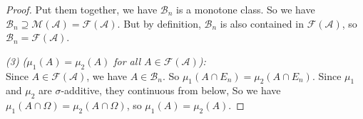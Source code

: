 \begin{proof}
  Put them together, we have $\mathcal{B}_n$ is a monotone class.
  So we have $\mathcal{B}_n \supseteq \mathcal{M}(\mathcal{A}) = \mathcal{F}(\mathcal{A})$.
  But by definition, $\mathcal{B}_n$ is also contained in $\mathcal{F}(\mathcal{A})$, so
  $\mathcal{B}_n = \mathcal{F}(\mathcal{A})$.

  \emph{(3) ($\mu_1(A) = \mu_2(A)$ for all $A\in\mathcal{F}(\mathcal{A})$):}\\
  Since $A\in\mathcal{F}(\mathcal{A})$, we have $A\in\mathcal{B}_n$.
  So $\mu_1(A\cap E_n) = \mu_2(A\cap E_n)$.
  Since $\mu_1$ and $\mu_2$ are $\sigma$-additive, they continuous from below,
  So we have $\mu_1(A\cap \Omega) = \mu_2(A\cap \Omega)$, so $\mu_1(A) = \mu_2(A)$.
\end{proof}

